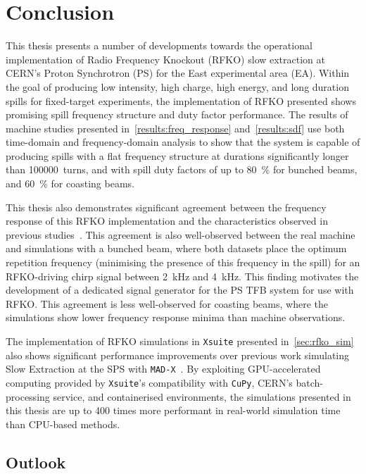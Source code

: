 \documentclass[a4paper,twoside,11pt]{report}
\begin{document}
\chapter{Conclusion}\label{chap:conclusion}

This thesis presents a number of developments towards the operational implementation of Radio Frequency Knockout (RFKO) slow extraction at CERN's Proton Synchrotron (PS) for the East experimental area (EA). Within the goal of producing low intensity, high charge, high energy, and long duration spills for fixed-target experiments, the implementation of RFKO presented shows promising spill frequency structure and duty factor performance. The results of machine studies presented in~\autoref{results:freq_response} and~\autoref{results:sdf} use both time-domain and frequency-domain analysis to show that the system is capable of producing spills with a flat frequency structure at durations significantly longer than \qty{100000}{turns}, and with spill duty factors of up to \qty{80}{\percent} for bunched beams, and \qty{60}{\percent} for coasting beams.

This thesis also demonstrates significant agreement between the frequency response of this RFKO implementation and the characteristics observed in previous studies~\cite{wepmp008,Pari:2780495}. This agreement is also well-observed between the real machine and simulations with a bunched beam, where both datasets place the optimum repetition frequency (minimising the presence of this frequency in the spill) for an RFKO-driving chirp signal between \qty{2}{\kilo\hertz} and \qty{4}{\kilo\hertz}. This finding motivates the development of a dedicated signal generator for the PS TFB system for use with RFKO. 
This agreement is less well-observed for coasting beams, where the simulations show lower frequency response minima than machine observations. 

The implementation of RFKO simulations in \verb|Xsuite| presented in~\autoref{sec:rfko_sim} also shows significant performance improvements over previous work simulating Slow Extraction at the SPS with \verb|MAD-X|~\cite{Schicho:2039579}. By exploiting GPU-accelerated computing provided by \verb|Xsuite|'s compatibility with \verb|CuPy|, CERN's batch-processing service, and containerised environments, the simulations presented in this thesis are up to 400 times more performant in real-world simulation time than CPU-based methods.

\section{Outlook}
\end{document}
